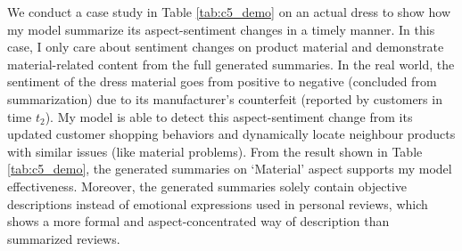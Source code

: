 We conduct a case study in Table \ref{tab:c5_demo} on an actual dress to show how my model summarize its aspect-sentiment changes in a timely manner. In this case, I only care about sentiment changes on product material and demonstrate material-related content from the full generated summaries. In the real world, the sentiment of the dress material goes from positive to negative (concluded from summarization) due to its manufacturer's counterfeit (reported by customers in time $t_2$). My model is able to  detect this aspect-sentiment change from its updated customer shopping behaviors and dynamically locate neighbour products with similar issues (like material problems). From the result shown in Table \ref{tab:c5_demo}, the generated summaries on `Material' aspect supports my model effectiveness. Moreover, the generated summaries solely contain objective descriptions instead of emotional expressions used in personal reviews, which shows a  more formal and aspect-concentrated way of description than summarized reviews. 
